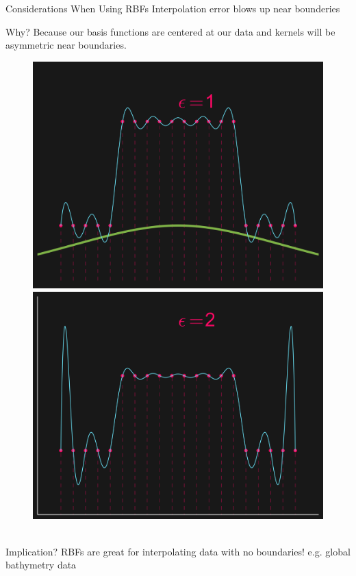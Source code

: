 \documentclass[12pt,t]{beamer}
\newcommand{\subt}[1]{{\footnotesize \color{subtitle} {#1}}}
\begin{document}
\begin{frame}{Considerations When Using RBFs}
\subt{Interpolation error blows up near bounderies}

Why? Because our basis functions are centered at our data and kernels will be asymmetric near boundaries.

\begin{figure}[!htb]
  \includegraphics[width=\linewidth]{conditioned.png}
\endminipage\hfill
{}
  \includegraphics[width=\linewidth]{illconditioned.png}
\endminipage\
\end{figure}

Implication? RBFs are great for interpolating data with no boundaries!
e.g. global bathymetry data

\note{}
\end{frame}
\end{document}
